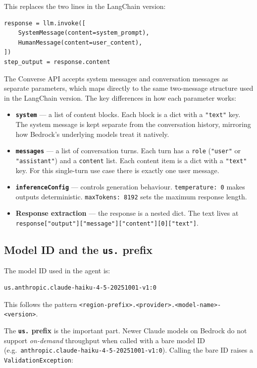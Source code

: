 \documentclass[12pt, a4paper]{article}
\begin{document}
This replaces the two lines in the LangChain version:

\begin{lstlisting}[style=pythonstyle]
response = llm.invoke([
    SystemMessage(content=system_prompt),
    HumanMessage(content=user_content),
])
step_output = response.content
\end{lstlisting}

The Converse API accepts system messages and conversation messages as separate parameters, which maps directly to the same two-message structure used in the LangChain version. The key differences in how each parameter works:

\begin{itemize}[leftmargin=1.5em]
  \item \textbf{\texttt{system}} — a list of content blocks. Each block is a dict with a \texttt{"text"} key. The system message is kept separate from the conversation history, mirroring how Bedrock's underlying models treat it natively.
  \item \textbf{\texttt{messages}} — a list of conversation turns. Each turn has a \texttt{role} (\texttt{"user"} or \texttt{"assistant"}) and a \texttt{content} list. Each content item is a dict with a \texttt{"text"} key. For this single-turn use case there is exactly one user message.
  \item \textbf{\texttt{inferenceConfig}} — controls generation behaviour. \texttt{temperature: 0} makes outputs deterministic. \texttt{maxTokens: 8192} sets the maximum response length.
  \item \textbf{Response extraction} — the response is a nested dict. The text lives at \texttt{response["output"]["message"]["content"][0]["text"]}.
\end{itemize}

\subsection{Model ID and the \texttt{us.} prefix}
\label{sec:model-id}

The model ID used in the agent is:

\begin{lstlisting}[language={}]
us.anthropic.claude-haiku-4-5-20251001-v1:0
\end{lstlisting}

This follows the pattern \texttt{<region-prefix>.<provider>.<model-name>-<version>}.

The \textbf{\texttt{us.} prefix} is the important part. Newer Claude models on Bedrock do not support \textit{on-demand} throughput when called with a bare model ID (e.g.\ \texttt{anthropic.claude-haiku-4-5-20251001-v1:0}). Calling the bare ID raises a \texttt{ValidationException}:
\end{document}
